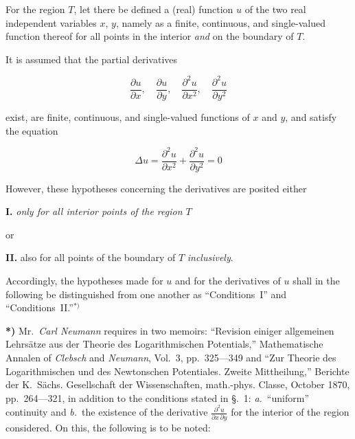 \documentclass{article}
\begin{document}
For the region $T$, let there be defined a (real) function $u$ of the two real independent variables $x$, $y$, namely as a finite, continuous, and single-valued function thereof for all points in the interior \emph{and} on the boundary of $T$.



It is assumed that the partial derivatives

\[

\frac{\partial u}{\partial x}, \quad \frac{\partial u}{\partial y}, \quad \frac{\partial^2 u}{\partial x^2}, \quad \frac{\partial^2 u}{\partial y^2}

\]

exist, are finite, continuous, and single-valued functions of $x$ and $y$, and satisfy the equation

\[

\Delta u = \frac{\partial^2 u}{\partial x^2} + \frac{\partial^2 u}{\partial y^2} = 0

\]



However, these hypotheses concerning the derivatives are posited either

\textbf{I.} \emph{only for all interior points of the region $T$}



or



\textbf{II.} also for all points of the boundary of $T$ \emph{inclusively}.

Accordingly, the hypotheses made for $u$ and for the derivatives of $u$ shall in the following be distinguished from one another as ``Conditions~I'' and ``Conditions~II.''${}^{*)}$







\textbf{*)} Mr.~\emph{Carl Neumann} requires in two memoirs: ``Revision einiger allgemeinen Lehrsätze aus der Theorie des Logarithmischen Potentials,'' Mathematische Annalen of \emph{Clebsch} and \emph{Neumann}, Vol.~3, pp.~325---349 and ``Zur Theorie des Logarithmischen und des Newtonschen Potentiales. Zweite Mittheilung,'' Berichte der K.~Sächs. Gesellschaft der Wissenschaften, math.-phys. Classe, October 1870, pp.~264---321, in addition to the conditions stated in §.~1: \emph{a.}~``uniform'' continuity and \emph{b.}~the existence of the derivative $\frac{\partial^2 u}{\partial x\,\partial y}$ for the interior of the region considered. On this, the following is to be noted:
\end{document}
